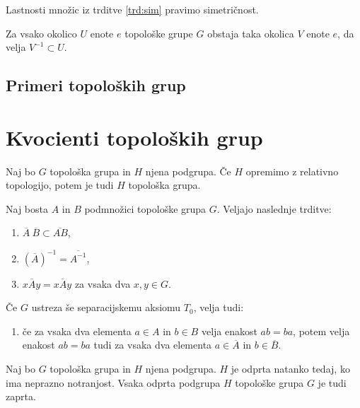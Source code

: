 \documentclass[mat1]{fmfdelo}
\newcommand{\closure}[1]{\overline{#1}}
\begin{document}
\begin{opomba}
Lastnosti množic iz trditve \ref{trd:sim} pravimo simetričnost.
\end{opomba}

\begin{posledica}\label{pos:sim}
Za vsako okolico $U$ enote $e$ topološke grupe $G$ obstaja taka okolica $V$ enote $e$, da velja $V^{-1} \subset U$.
\end{posledica}


\subsection{Primeri topoloških grup}




\section{Kvocienti topoloških grup}

\begin{trditev}\label{trd:toppodgrupa}
Naj bo $G$ topološka grupa in $H$ njena podgrupa. Če $H$ opremimo z relativno topologijo, potem je tudi $H$ topološka grupa.
\end{trditev}

\begin{trditev}\label{trd:zaprtost}
Naj bosta $A$ in $B$ podmnožici topološke grupa $G$. Veljajo naslednje trditve:
\begin{enumerate}
\item $\closure{A}\ \closure{B} \subset \closure{A B}$,
\item $(\closure{A})^{-1} = \closure{A^{-1}}$,
\item $x \closure{A} y = \closure{x A y}$ za vsaka dva $x, y \in G$.
\end{enumerate}

Če $G$ ustreza še separacijskemu aksiomu $T_0$, velja tudi:
\begin{enumerate}[resume]
\item če za vsaka dva elementa $a \in A$ in $b \in B$ velja enakost $ab = ba$, potem velja enakost $ab = ba$ tudi za vsaka dva elementa $a \in \closure{A}$ in $b \in \closure{B}$.
\end{enumerate}
\end{trditev}

\begin{trditev}\label{trd:odpzap}
Naj bo $G$ topološka grupa in $H$ njena podgrupa. $H$ je odprta natanko tedaj, ko ima neprazno notranjost. Vsaka odprta podgrupa $H$ topološke grupa $G$ je tudi zaprta.
\end{trditev}
\end{document}
